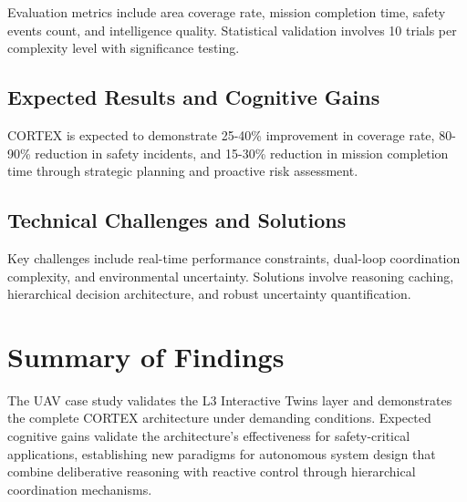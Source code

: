 Evaluation metrics include area coverage rate, mission completion time, safety events count, and intelligence quality. Statistical validation involves 10 trials per complexity level with significance testing.

\subsection{Expected Results and Cognitive Gains}

CORTEX is expected to demonstrate 25-40\% improvement in coverage rate, 80-90\% reduction in safety incidents, and 15-30\% reduction in mission completion time through strategic planning and proactive risk assessment.

\subsection{Technical Challenges and Solutions}

Key challenges include real-time performance constraints, dual-loop coordination complexity, and environmental uncertainty. Solutions involve reasoning caching, hierarchical decision architecture, and robust uncertainty quantification.

\section{Summary of Findings}

The UAV case study validates the L3 Interactive Twins layer and demonstrates the complete CORTEX architecture under demanding conditions. Expected cognitive gains validate the architecture's effectiveness for safety-critical applications, establishing new paradigms for autonomous system design that combine deliberative reasoning with reactive control through hierarchical coordination mechanisms. 